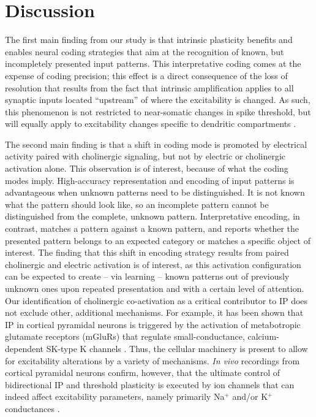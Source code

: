 \section{Discussion}

The first main finding from our study is
        that intrinsic plasticity benefits and enables neural coding strategies
            that aim at the recognition of known, but incompletely presented input patterns.
    This interpretative coding comes at the expense of coding precision;
        this effect is a direct consequence of the loss of resolution
            that results from the fact that intrinsic amplification applies
            to all synaptic inputs located ``upstream'' of where the excitability is changed.
    As such, this phenomenon is not restricted to near-somatic changes in spike threshold,
        but will equally apply to excitability changes specific to dendritic compartments
        \citep{Losonczy2008-pi,Ohtsuki2012-ds}.

The second main finding is that a shift in coding mode
        is promoted by electrical activity paired with cholinergic signaling,
        but not by electric or cholinergic activation alone.
    This observation is of interest, because of what the coding modes imply.
    High-accuracy representation and encoding of input patterns is advantageous
        when unknown patterns need to be distinguished.
    It is not known what the pattern should look like,
        so an incomplete pattern cannot be distinguished from the complete, unknown pattern.
    Interpretative encoding, in contrast,
        matches a pattern against a known pattern,
        and reports whether
            the presented pattern belongs to an expected category
            or matches a specific object of interest.
    The finding that this shift in encoding strategy results
        from paired cholinergic and electric activation is of interest,
        as this activation configuration can be expected to create -- via learning --
        known patterns out of previously unknown ones
        upon repeated presentation and with a certain level of attention.
    Our identification of cholinergic co-activation as a critical contributor to IP
        does not exclude other, additional mechanisms.
    For example, it has been shown that IP in cortical pyramidal neurons
        is triggered by the activation of metabotropic glutamate receptors (mGluRs) that
            regulate small-conductance, calcium-dependent SK-type K channels \citep{Sourdet2003-qr}.
    Thus, the cellular machinery is present to allow for excitability alterations by a variety of mechanisms.
    \textit{In vivo} recordings from cortical pyramidal neurons confirm, however, that
        the ultimate control of bidirectional IP and threshold plasticity is executed by ion channels
            that can indeed affect excitability parameters,
            namely primarily Na$^+$ and/or K$^+$ conductances \citep{Mahon2012-bt}.

